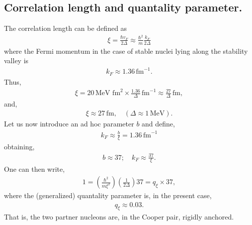 \begin{subappendices}
\section{Correlation length and quantality parameter.}\label{App6H}
The correlation length can be defined as
\begin{align}\label{eqApp6H1}
\xi=\frac{\hbar v_F}{2\Delta}\approx\frac{\hbar^2}{m}\frac{k_F}{2\Delta}
\end{align}
where the Fermi momentum in the case of stable nuclei lying along the stability valley is
\begin{align}\label{eqApp6H2}
k_F\approx 1.36\,\text{fm}^{-1}.
\end{align}
Thus,
\begin{align}\label{eqApp6H3}
\xi=20\,\text{MeV fm}^2\times \frac{1.36}{\Delta}\,\text{fm}^{-1}\approx \frac{27}{\Delta}\,\text{fm},
\end{align}
and,
\begin{align}\label{eqApp6H4}
\xi\approx 27\,\text{fm},\quad (\Delta\approx1\,\text{MeV}).
\end{align}
Let us now introduce an ad hoc parameter $b$ and define,
\begin{align}\label{eqApp6H5}
k_F\approx\frac{b}{\xi}=1.36\,\text{fm}^{-1}
\end{align}
obtaining, 
\begin{align}\label{eqApp6H6}
b\approx 37;\quad k_F\approx \frac{37}{\xi}.
\end{align}  
One can then write,
\begin{align}\label{eqApp6H7}
1=\left(\frac{\hbar^2}{m\xi^2}\right)\left(\frac{1}{2\Delta}\right)37=q_\xi\times 37,
\end{align} 
where the (generalized) quantality parameter is, in the present case,
\begin{align}\label{eqApp6H8}
q_\xi\approx0.03.
\end{align} 
That is, the two partner nucleons are, in the Cooper pair, rigidly anchored.


\end{subappendices}

